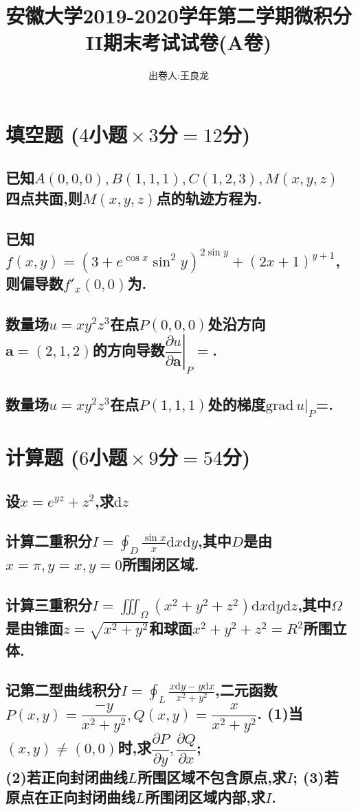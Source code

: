 \documentclass[UTF8]{article}
\title{安徽大学2019-2020学年第二学期微积分II期末考试试卷(A卷)}
\author{出卷人:王良龙}
\date{}
\newcommand{\ptsMulti}[3]{ \small($#1\!\!$小题$\!\!\times #2\!\!$分$\!\!=\!\!#3\!\!$分)}
\newcommand{\longline}{\underline{\hspace{2cm}}}
\renewcommand{\d}{\mathrm{d}}
\newcommand{\grad}{\mathrm{grad}\,}
\begin{document}
    \maketitle

    \section{填空题\ptsMulti{4}{3}{12}}
        \subsection{已知$A(0,0,0),B(1,1,1),C(1,2,3),M(x,y,z)$四点共面,则$M(x,y,z)$点的轨迹方程为\longline.}
        \subsection{已知$f(x,y)=(3+e^{\cos x}\sin^2y)^{2\sin y}+(2x+1)^{y+1} $,则偏导数$ f'_x(0,0) $为\longline.}
        \subsection{数量场$u=xy^2z^3$在点$P(0,0,0)$处沿方向$\bm{a}=(2,1,2)$的方向导数$\left.\dfrac{\partial u}{\partial \bm{a}}\right|_P=$\longline.}
        \subsection{数量场$u=xy^2z^3$在点$P(1,1,1)$处的梯度$\grad u|_P$=\longline.}

    \section{计算题\ptsMulti{6}{9}{54}}
    \subsection{设$ x=e^{yz}+z^2 $,求$ \d z $}
    \subsection{计算二重积分$\displaystyle I=\oint_D \frac{\sin x}{x}\d x\d y $,其中$ D $是由$ x=\pi,y=x,y=0 $所围闭区域.}
    \subsection{计算三重积分$\displaystyle I=\iiint_\Omega(x^2+y^2+z^2)\d x\d y\d z $,其中$\Omega$是由锥面$z=\sqrt{x^2+y^2}$和球面$x^2+y^2+z^2=R^2$所围立体.}
    \subsection{\!
        记第二型曲线积分$\displaystyle \!\! I\!\!=\!\!\oint_L \frac{x\d y-y\d x}{x^2+y^2}$,二元函数$\!\!P(x,y)\!\!=\!\!\dfrac{-y}{x^2+y^2},Q(x,y)\!\!=\!\!\dfrac{x}{x^2+y^2}$.
        \hspace{-9pt} (1)当$\!(x,y)\!\neq\! (0,0)\!$时,求$\dfrac{\partial P}{\partial y},\dfrac{\partial Q}{\partial x}$;\\ 
        (2)若正向封闭曲线$L$所围区域不包含原点,求$I$;
        (3)若原点在正向封闭曲线$L$所围闭区域内部,求$I$.
    }
\end{document}
